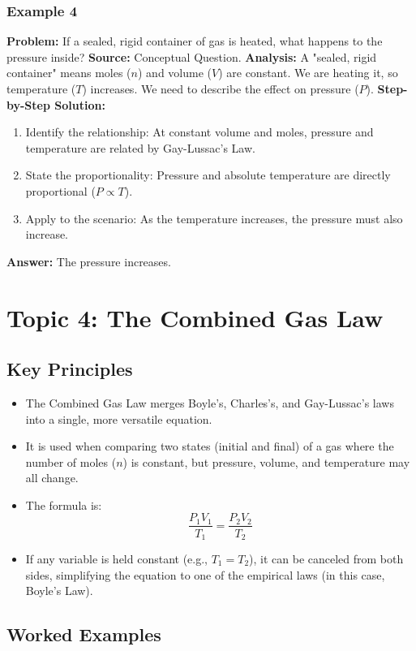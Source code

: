 \documentclass{article}
\begin{document}
\subsubsection{Example 4}
\textbf{Problem:} If a sealed, rigid container of gas is heated, what happens to the pressure inside?
\textbf{Source:} Conceptual Question.
\textbf{Analysis:} A "sealed, rigid container" means moles ($n$) and volume ($V$) are constant. We are heating it, so temperature ($T$) increases. We need to describe the effect on pressure ($P$).
\textbf{Step-by-Step Solution:}
\begin{enumerate}
    \item Identify the relationship: At constant volume and moles, pressure and temperature are related by Gay-Lussac's Law.
    \item State the proportionality: Pressure and absolute temperature are directly proportional ($P \propto T$).
    \item Apply to the scenario: As the temperature increases, the pressure must also increase.
\end{enumerate}
\textbf{Answer:} The pressure increases.

\section{Topic 4: The Combined Gas Law}
\subsection{Key Principles}
\begin{itemize}
    \item The Combined Gas Law merges Boyle's, Charles's, and Gay-Lussac's laws into a single, more versatile equation.
    \item It is used when comparing two states (initial and final) of a gas where the number of moles ($n$) is constant, but pressure, volume, and temperature may all change.
    \item The formula is:
    \[ \frac{P_1V_1}{T_1} = \frac{P_2V_2}{T_2} \]
    \item If any variable is held constant (e.g., $T_1 = T_2$), it can be canceled from both sides, simplifying the equation to one of the empirical laws (in this case, Boyle's Law).
\end{itemize}

\subsection{Worked Examples}
\end{document}
